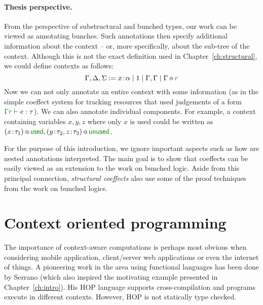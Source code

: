 \paragraph{Thesis perspective.}

From the perspective of substructural and bunched types, our work can be viewed as annotating
bunches. Such annotations then specify additional information about the context -- or, more
specifically, about the sub-tree of the context. Although this is not the exact definition used in
Chapter~\ref{ch:structural}, we could define contexts as follows:
%
\begin{equation*}
\Gamma, \Delta, \Sigma := x\!:\!\alpha \sep 1 \sep \Gamma, \Gamma \sep \coctx{\Gamma}{\cclrd{r}}
\end{equation*}
%
Now we can not only annotate an entire context with some information (as in the simple coeffect
system for tracking resources that used judgements of a form $\cclrd{\Gamma}{\cclrd{r}} \vdash e : \tau$).
We can also annotate individual components. For example, a context containing variables $x,y,z$
where only $x$ is used could be written as $\coctx{(x\!:\!\tau_1)}{\ident{\cclrd{used}}}, \coctx{(y\!:\!\tau_2, z\!:\!\tau_3)}{\ident{\cclrd{unused}}}$.

For the purpose of this introduction, we ignore important aspects such as how are nested annotations
interpreted. The main goal is to show that coeffects can be easily viewed as an extension to the
work on bunched logic. Aside from this principal connection, \emph{structural coeffects} also
use some of the proof techniques from the work on bunched logics.



%
%

\section{Context oriented programming}
\label{sec:path-cop}

The importance of context-aware computations is perhaps most obvious when considering mobile
application, client/server web applications or even the internet of things. A pioneering work
in the area using functional languages has been done by Serrano \cite{app-hop-diffuse,app-hop-lang}
(which also inspired the motivating example presented in Chapter~\ref{ch:intro}). His HOP language supports
cross-compilation and programs execute in different contexts. However, HOP is not statically
type checked.

